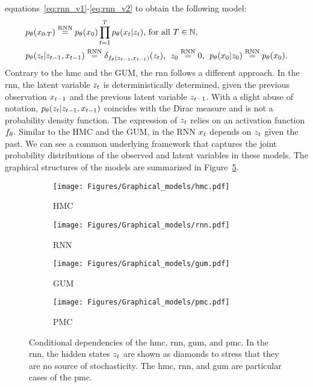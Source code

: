 equations~\eqref{eq:rnn_v1}-\eqref{eq:rnn_v2}
to obtain the following model:
\begin{align*}
    &p_{\theta}(x_{0:T})\overset {\rm RNN}{=}  p_{\theta}(x_{0}) \prod_{t=1}^T 
    p_{\theta}(x_t|z_t	) \text{, } \text{for all } T \in \mathbb{N} \text{,}\\
    &p_{\theta}(z_t|z_{t-1},x_{t-1})\overset {\rm RNN}{=} 
    \delta_{f_{\theta}(z_{t-1},x_{t-1})}(z_t) \text{, } \;  z_0\overset {\rm RNN}{=} 0 \text{, } \; p_{\theta}(x_{0}|z_{0}) \overset {\rm RNN}{=}  p_{\theta}(x_{0}) \text{.}
\end{align*}
Contrary to the \gls*{hmc} and the GUM, the \gls*{rnn} follows a different approach.
In the \gls*{rnn}, the latent variable $z_t$ is deterministically determined,
given the previous observation $x_{t-1}$ and the previous latent variable $z_{t-1}$.
With a slight abuse of notation,  $p_{\theta}(z_t|z_{t-1},x_{t-1})$ 
coincides with the Dirac measure and is not a probability density function.
The expression of $z_t$ relies on an activation function $f_{\theta}$.
Similar to the HMC and the GUM, in the RNN $x_t$ depends on $z_t$ given the past.
We can see a common underlying framework that captures the joint probability
distributions of the observed and latent variables in these models.
The graphical structures of the  models are summarized in 
Figure~\ref{fig:graphical_models}.



\begin{figure}[htb]
  \begin{subfigure}[b]{0.48\linewidth}
    \centering
    \texttt{[image: Figures/Graphical\_models/hmc.pdf]}
    \caption{HMC}
    \label{fig:hmm}
    \vspace{1.1cm}
  \end{subfigure}
  \hfill
  \begin{subfigure}[b]{0.47\linewidth}
    \centering
    \texttt{[image: Figures/Graphical\_models/rnn.pdf]}
    \caption{RNN}
    \label{fig:rnn}
    \vspace{1.1cm}
  \end{subfigure}

  \begin{subfigure}[b]{0.48\linewidth}
    \centering
    \texttt{[image: Figures/Graphical\_models/gum.pdf]}
    \caption{GUM}
    \label{fig:gum}
  \end{subfigure}
  \hfill
  \begin{subfigure}[b]{0.48\linewidth}
    \centering
    \texttt{[image: Figures/Graphical\_models/pmc.pdf]}
    \caption{PMC}
    \label{fig:pmc}
  \end{subfigure}

  \caption{Conditional dependencies of the \gls*{hmc}, \gls*{rnn}, 
  \gls*{gum}, and \gls*{pmc}. In the \gls*{rnn}, 
  the hidden states $z_t$ are shown as diamonds to stress 
  that they are no source of stochasticity. 
  The \gls*{hmc}, \gls*{rnn}, and \gls*{gum} are particular cases of the \gls*{pmc}.}
  \label{fig:graphical_models}
\end{figure}



